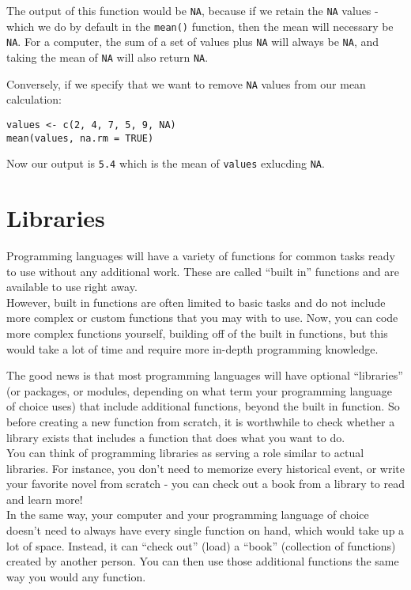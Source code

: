 \documentclass[
]{book}
\begin{document}
The output of this function would be \texttt{NA}, because if we retain the \texttt{NA} values - which we do by default in the \texttt{mean()} function, then the mean will necessary be \texttt{NA}. For a computer, the sum of a set of values plus \texttt{NA} will always be \texttt{NA}, and taking the mean of \texttt{NA} will also return \texttt{NA}.

Conversely, if we specify that we want to remove \texttt{NA} values from our mean calculation:

\begin{verbatim}
values <- c(2, 4, 7, 5, 9, NA)
mean(values, na.rm = TRUE)
\end{verbatim}

Now our output is \texttt{5.4} which is the mean of \texttt{values} exlucding \texttt{NA}.

\section{Libraries}\label{libraries}

Programming languages will have a variety of functions for common tasks ready to use without any additional work. These are called ``built in'' functions and are available to use right away.\\

However, built in functions are often limited to basic tasks and do not include more complex or custom functions that you may with to use. Now, you can code more complex functions yourself, building off of the built in functions, but this would take a lot of time and require more in-depth programming knowledge.

The good news is that most programming languages will have optional ``libraries'' (or packages, or modules, depending on what term your programming language of choice uses) that include additional functions, beyond the built in function. So before creating a new function from scratch, it is worthwhile to check whether a library exists that includes a function that does what you want to do.\\

You can think of programming libraries as serving a role similar to actual libraries. For instance, you don't need to memorize every historical event, or write your favorite novel from scratch - you can check out a book from a library to read and learn more!\\

In the same way, your computer and your programming language of choice doesn't need to always have every single function on hand, which would take up a lot of space. Instead, it can ``check out'' (load) a ``book'' (collection of functions) created by another person. You can then use those additional functions the same way you would any function.\\
\end{document}

